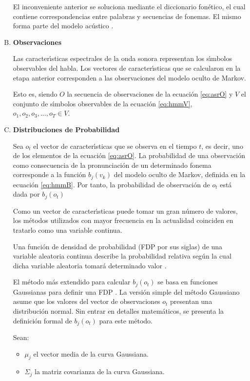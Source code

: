 \begin{enumerate}[A)]
	El inconveniente anterior se soluciona mediante el diccionario fon\'etico, el cual contiene correspondencias entre palabras y secuencias de fonemas. El mismo forma parte del modelo ac\'ustico \cite{huang-handbook10}.

	\item \textbf{Observaciones}


	Las caracter{\'\i}sticas espectrales de la onda sonora representan los s{\'\i}mbolos observables del habla.
	Los vectores de caracter{\'\i}sticas que se calcularon en la etapa anterior corresponden a las observaciones
	del modelo oculto de Markov.

	Esto es, siendo $O$ la secuencia de observaciones de la ecuaci\'on \ref{eq:asrO} 
	y $V$ el conjunto de s{\'\i}mbolos observables de la ecuaci\'on \ref{eq:hmmV}, $o_1,o_2,o_3,\ldots,o_T \in V$.

	\item \textbf{Distribuciones de Probabilidad}

	Sea $o_t$ el vector de caracter{\'\i}sticas que se observa en el tiempo $t$, es decir, uno de los elementos
	de la ecuaci\'on \ref{eq:asrO}.
	La probabilidad de una observaci\'on como consecuencia de la pronunciaci\'on de un determinado fonema 
	corresponde a la funci\'on $b_j(v_k)$ del modelo oculto de Markov, definida en la ecuaci\'on \ref{eq:hmmB}.
	Por tanto, la probabilidad de observaci\'on de $o_t$ est\'a dada por $b_j(o_t)$ 

	Como un vector de caracter{\'\i}sticas puede tomar un gran n\'umero de valores, los m\'etodos utilizados con
	mayor frecuencia en la actualidad coinciden en tratarlo como una variable continua.

	Una funci\'on de densidad de probabilidad (FDP por sus siglas) de una variable aleatoria continua describe la probabilidad relativa seg\'un la cual dicha variable aleatoria tomar\'a determinado valor \cite{Evans2011}.

	El m\'etodo m\'as extendido para calcular $b_j(o_t)$ se basa en funciones Gaussianas para definir 
	una FDP \cite{Jurafsky}.
	La versi\'{o}n simple del m\'etodo Gaussiano asume que los valores del vector de observaciones $o_t$ presentan una distribuci\'on normal. Sin entrar en detalles matem\'aticos, se presenta la definici\'on formal 
	de $b_j(o_t)$ para este m\'etodo.

	Sean:

	\begin{itemize}
		\item $\mu_j$ el vector media de la curva Gaussiana.
		\item $\Sigma_j$ la matriz covarianza de la curva Gaussiana.
	\end{itemize}


\end{enumerate}

